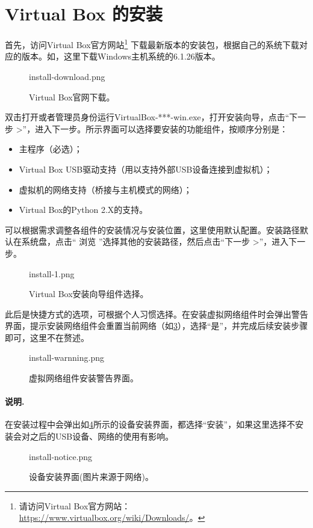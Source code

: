 \documentclass[final]{cvpr}
\newcommand{\mypara}[1]{\paragraph{#1.}}
\begin{document}
\section{Virtual Box 的安装}\label{sec:installVBox}

首先，访问Virtual Box官方网站\footnote{请访问Virtual Box官方网站：\url{https://www.virtualbox.org/wiki/Downloads/}。 }
下载最新版本的安装包，根据自己的系统下载对应的版本。如，这里下载Windows主机系统的6.1.26版本。
\begin{figure}
  	\begin{overpic}[width=\columnwidth]{install-download.png}\end{overpic}
    \caption{Virtual Box官网下载。}\label{fig:download}
\end{figure}
双击打开或者管理员身份运行VirtualBox-***-win.exe，打开安装向导，点击“下一步 >”，进入下一步。所示界面可以选择要安装的功能组件，按顺序分别是：
\begin{itemize}
    \item 主程序（必选）；
    \item Virtual Box USB驱动支持（用以支持外部USB设备连接到虚拟机）；
    \item 虚拟机的网络支持（桥接与主机模式的网络）；
    \item Virtual Box的Python 2.X的支持。
\end{itemize}
可以根据需求调整各组件的安装情况与安装位置，这里使用默认配置。安装路径默认在系统盘，点击“ 浏览 ”选择其他的安装路径，然后点击“下一步 >”，进入下一步。
\begin{figure}
  	\begin{overpic}[width=\columnwidth]{install-1.png}\end{overpic}
    \caption{Virtual Box安装向导组件选择。}\label{fig:install1}
\end{figure}

此后是快捷方式的选项，可根据个人习惯选择。在安装虚拟网络组件时会弹出警告界面，提示安装网络组件会重置当前网络（如\ref{fig:install-warnning}），选择“是”，并完成后续安装步骤即可，这里不在赘述。
\begin{figure}
  	\begin{overpic}[width=\columnwidth]{install-warnning.png}\end{overpic}
    \caption{虚拟网络组件安装警告界面。}\label{fig:install-warnning}
\end{figure}

\mypara{说明}  在安装过程中会弹出如\ref{fig:install-notice}所示的设备安装界面，都选择“安装”，如果这里选择不安装会对之后的USB设备、网络的使用有影响。
\begin{figure}
  	\begin{overpic}[width=\columnwidth]{install-notice.png}\end{overpic}
    \caption{设备安装界面(图片来源于网络)\cite{Web/installVB}。}\label{fig:install-notice}
\end{figure}
\end{document}
